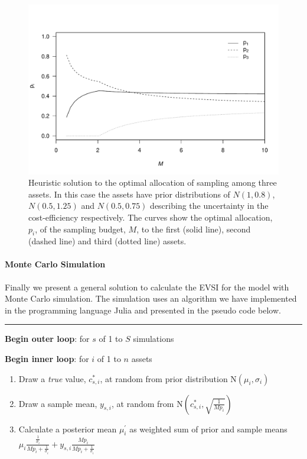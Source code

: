 \documentclass[]{article}
\theoremstyle{definition}
\theoremstyle{definition}
\theoremstyle{remark}
\begin{document}
\begin{figure}[htbp]
\centering
\includegraphics{voiConsAuc_files/figure-latex/evsi3heuplot-1.pdf}
\caption{\label{fig:evsi3heuplot}Heuristic solution to the optimal allocation of
sampling among three assets. In this case the assets have prior
distributions of \(N(1, 0.8)\), \(N(0.5, 1.25)\) and \(N(0.5, 0.75)\)
describing the uncertainty in the cost-efficiency respectively. The
curves show the optimal allocation, \(p_i\), of the sampling budget,
\(M\), to the first (solid line), second (dashed line) and third (dotted
line) assets.}
\end{figure}

\paragraph*{Monte Carlo Simulation}\label{monte-carlo-simulation}

Finally we present a general solution to calculate the EVSI for the
model with Monte Carlo simulation. The simulation uses an algorithm we
have implemented in the programming language Julia \citep{Bezanson2017}
and presented in the pseudo code below.

\begin{center}\rule{0.5\linewidth}{\linethickness}\end{center}

\textbf{Begin outer loop}: for \(s\) of 1 to \(S\) simulations

\textbf{Begin inner loop}: for \(i\) of 1 to \(n\) assets

\begin{enumerate}
\def\labelenumi{\arabic{enumi}.}
\item
  Draw a \emph{true} value, \(c^*_{s,i}\), at random from prior
  distribution \(\mathrm{N}(\mu_i, \sigma_i)\)
\item
  Draw a sample mean, \(y_{s,i}\), at random from
  \(\mathrm{N}(c^*_{s, i}, \sqrt{\frac{1}{Mp_i}})\)
\item
  Calculate a posterior mean \(\mu^\prime_i\) as weighted sum of prior
  and sample means
  \(\mu_i \frac{\frac{1}{\sigma_i}}{Mp_i + \frac{1}{\sigma_i}} + y_{s,i}\frac{Mp_i}{Mp_i + \frac{1}{\sigma_i}}\)
\end{enumerate}
\end{document}
